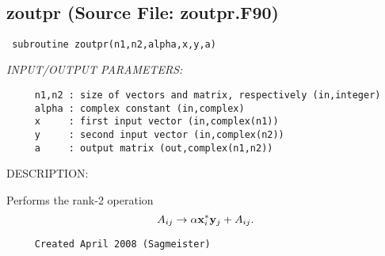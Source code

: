 \documentclass[11pt]{article}
\begin{document}
\mbox{}\hrulefill\ 
 
\subsection{zoutpr (Source File: zoutpr.F90)}


\begin{verbatim} subroutine zoutpr(n1,n2,alpha,x,y,a)\end{verbatim}{\em INPUT/OUTPUT PARAMETERS:}
\begin{verbatim}     n1,n2 : size of vectors and matrix, respectively (in,integer)
     alpha : complex constant (in,complex)
     x     : first input vector (in,complex(n1))
     y     : second input vector (in,complex(n2))
     a     : output matrix (out,complex(n1,n2))\end{verbatim}
{\sf DESCRIPTION:\\ }


     Performs the rank-2 operation
     $$ A_{ij}\rightarrow\alpha{\bf x}_i^*{\bf y}_j+A_{ij}. $$
  
\begin{verbatim}     Created April 2008 (Sagmeister)\end{verbatim}

\end{document}
